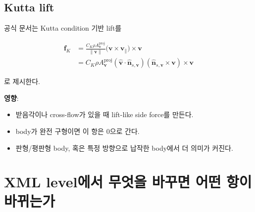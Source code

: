 \documentclass[11pt,a4paper]{article}
\begin{document}
\subsection{Kutta lift}

공식 문서는 Kutta condition 기반 lift를

\begin{align*}
\mathbf{f}_K
&=
\frac{C_K \rho A^{\mathrm{proj}}_{\mathbf{v}}}{\|\mathbf{v}\|}
\big(\mathbf{v}\times\mathbf{v}_{\parallel}\big)\times\mathbf{v} \\
&=
C_K \rho A^{\mathrm{proj}}_{\mathbf{v}}
\left(\hat{\mathbf{v}}\cdot\hat{\mathbf{n}}_{s,\mathbf{v}}\right)
\left(\hat{\mathbf{n}}_{s,\mathbf{v}} \times \mathbf{v}\right)\times\mathbf{v}
\end{align*}

로 제시한다.

\textbf{영향}:
\begin{itemize}[leftmargin=2em]
  \item 받음각이나 cross-flow가 있을 때 lift-like side force를 만든다.
  \item body가 완전 구형이면 이 항은 0으로 간다.
  \item 판형/평판형 body, 혹은 특정 방향으로 납작한 body에서 더 의미가 커진다.
\end{itemize}

\section{XML level에서 무엇을 바꾸면 어떤 항이 바뀌는가}
\end{document}
